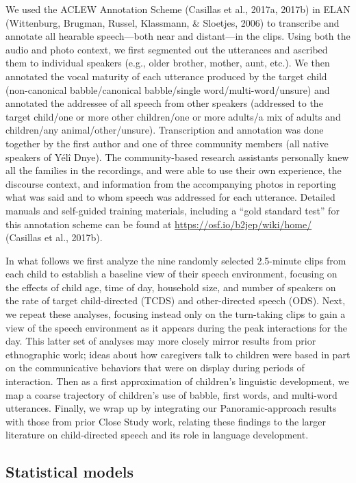 \documentclass[,man,floatsintext]{apa6}
\begin{document}
We used the ACLEW Annotation Scheme (Casillas et al., 2017a, 2017b) in
ELAN (Wittenburg, Brugman, Russel, Klassmann, \& Sloetjes, 2006) to
transcribe and annotate all hearable speech---both near and distant---in
the clips. Using both the audio and photo context, we first segmented
out the utterances and ascribed them to individual speakers (e.g., older
brother, mother, aunt, etc.). We then annotated the vocal maturity of
each utterance produced by the target child (non-canonical
babble/canonical babble/single word/multi-word/unsure) and annotated the
addressee of all speech from other speakers (addressed to the target
child/one or more other children/one or more adults/a mix of adults and
children/any animal/other/unsure). Transcription and annotation was done
together by the first author and one of three community members (all
native speakers of Yélî Dnye). The community-based research assistants
personally knew all the families in the recordings, and were able to use
their own experience, the discourse context, and information from the
accompanying photos in reporting what was said and to whom speech was
addressed for each utterance. Detailed manuals and self-guided training
materials, including a \enquote{gold standard test} for this annotation
scheme can be found at \url{https://osf.io/b2jep/wiki/home/} (Casillas
et al., 2017b).

In what follows we first analyze the nine randomly selected 2.5-minute
clips from each child to establish a baseline view of their speech
environment, focusing on the effects of child age, time of day,
household size, and number of speakers on the rate of target
child-directed (TCDS) and other-directed speech (ODS). Next, we repeat
these analyses, focusing instead only on the turn-taking clips to gain a
view of the speech environment as it appears during the peak
interactions for the day. This latter set of analyses may more closely
mirror results from prior ethnographic work; ideas about how caregivers
talk to children were based in part on the communicative behaviors that
were on display during periods of interaction. Then as a first
approximation of children's linguistic development, we map a coarse
trajectory of children's use of babble, first words, and multi-word
utterances. Finally, we wrap up by integrating our Panoramic-approach
results with those from prior Close Study work, relating these findings
to the larger literature on child-directed speech and its role in
language development.

\subsection{Statistical models}\label{statistical-models}
\end{document}
